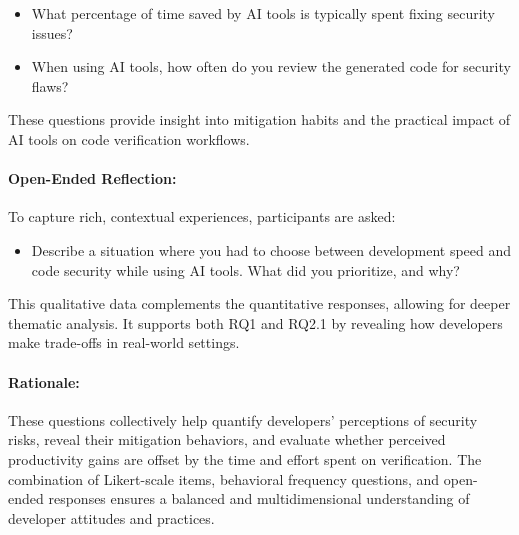\begin{itemize}
    \item What percentage of time saved by AI tools is typically spent fixing security issues?
    \item When using AI tools, how often do you review the generated code for security flaws?
\end{itemize}

These questions provide insight into mitigation habits and the practical impact of AI tools on code verification workflows.

\vspace{0.5em}
\paragraph{Open-Ended Reflection:}
To capture rich, contextual experiences, participants are asked:

\begin{itemize}
    \item Describe a situation where you had to choose between development speed and code security while using AI tools. What did you prioritize, and why?
\end{itemize}

This qualitative data complements the quantitative responses, allowing for deeper thematic analysis. It supports both RQ1 and RQ2.1 by revealing how developers make trade-offs in real-world settings.

\vspace{0.5em}
\paragraph{Rationale:}
These questions collectively help quantify developers' perceptions of security risks, reveal their mitigation behaviors, and evaluate whether perceived productivity gains are offset by the time and effort spent on verification. The combination of Likert-scale items, behavioral frequency questions, and open-ended responses ensures a balanced and multidimensional understanding of developer attitudes and practices.


